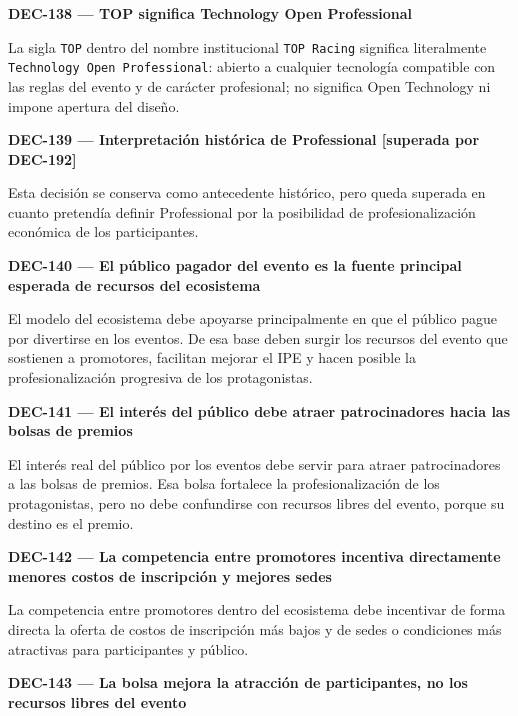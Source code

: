\documentclass[10pt,letterpaper]{article}
\begin{document}
\noindent\textbf{DEC-138 --- TOP significa Technology Open Professional}\par
La sigla \texttt{TOP} dentro del nombre institucional \texttt{TOP Racing} significa literalmente \texttt{Technology Open Professional}: abierto a cualquier tecnología compatible con las reglas del evento y de carácter profesional; no significa Open Technology ni impone apertura del diseño.\par\vspace{0.45em}
\noindent\textbf{DEC-139 --- Interpretación histórica de Professional [superada por DEC-192]}\par
Esta decisión se conserva como antecedente histórico, pero queda superada en cuanto pretendía definir Professional por la posibilidad de profesionalización económica de los participantes.\par\vspace{0.45em}
\noindent\textbf{DEC-140 --- El público pagador del evento es la fuente principal esperada de recursos del ecosistema}\par
El modelo del ecosistema debe apoyarse principalmente en que el público pague por divertirse en los eventos. De esa base deben surgir los recursos del evento que sostienen a promotores, facilitan mejorar el IPE y hacen posible la profesionalización progresiva de los protagonistas.\par\vspace{0.45em}
\noindent\textbf{DEC-141 --- El interés del público debe atraer patrocinadores hacia las bolsas de premios}\par
El interés real del público por los eventos debe servir para atraer patrocinadores a las bolsas de premios. Esa bolsa fortalece la profesionalización de los protagonistas, pero no debe confundirse con recursos libres del evento, porque su destino es el premio.\par\vspace{0.45em}
\noindent\textbf{DEC-142 --- La competencia entre promotores incentiva directamente menores costos de inscripción y mejores sedes}\par
La competencia entre promotores dentro del ecosistema debe incentivar de forma directa la oferta de costos de inscripción más bajos y de sedes o condiciones más atractivas para participantes y público.\par\vspace{0.45em}
\noindent\textbf{DEC-143 --- La bolsa mejora la atracción de participantes, no los recursos libres del evento}\par
\end{document}
